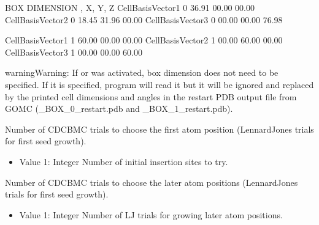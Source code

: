 \documentclass[letterpaper,10pt,english]{sphinxmanual}
\begin{document}
\begin{description}
\begin{sphinxVerbatim}[commandchars=\\\{\}]
\PYGZsh{}\PYGZsh{}\PYGZsh{}\PYGZsh{}\PYGZsh{}\PYGZsh{}\PYGZsh{}\PYGZsh{}\PYGZsh{}\PYGZsh{}\PYGZsh{}\PYGZsh{}\PYGZsh{}\PYGZsh{}\PYGZsh{}\PYGZsh{}\PYGZsh{}\PYGZsh{}\PYGZsh{}\PYGZsh{}\PYGZsh{}\PYGZsh{}\PYGZsh{}\PYGZsh{}\PYGZsh{}\PYGZsh{}\PYGZsh{}\PYGZsh{}\PYGZsh{}\PYGZsh{}\PYGZsh{}\PYGZsh{}\PYGZsh{}\PYGZsh{}\PYGZsh{}\PYGZsh{}\PYGZsh{}\PYGZsh{}\PYGZsh{}\PYGZsh{}\PYGZsh{}\PYGZsh{}\PYGZsh{}\PYGZsh{}
\PYGZsh{} BOX DIMENSION \PYGZsh{}, X, Y, Z
\PYGZsh{}\PYGZsh{}\PYGZsh{}\PYGZsh{}\PYGZsh{}\PYGZsh{}\PYGZsh{}\PYGZsh{}\PYGZsh{}\PYGZsh{}\PYGZsh{}\PYGZsh{}\PYGZsh{}\PYGZsh{}\PYGZsh{}\PYGZsh{}\PYGZsh{}\PYGZsh{}\PYGZsh{}\PYGZsh{}\PYGZsh{}\PYGZsh{}\PYGZsh{}\PYGZsh{}\PYGZsh{}\PYGZsh{}\PYGZsh{}\PYGZsh{}\PYGZsh{}\PYGZsh{}\PYGZsh{}\PYGZsh{}\PYGZsh{}\PYGZsh{}\PYGZsh{}\PYGZsh{}\PYGZsh{}\PYGZsh{}\PYGZsh{}\PYGZsh{}\PYGZsh{}\PYGZsh{}\PYGZsh{}\PYGZsh{}
CellBasisVector1  0   36.91   00.00   00.00
CellBasisVector2  0   \PYGZhy{}18.45  31.96   00.00
CellBasisVector3  0   00.00   00.00   76.98

CellBasisVector1  1   60.00   00.00   00.00
CellBasisVector2  1   00.00   60.00   00.00
CellBasisVector3  1   00.00   00.00   60.00
\end{sphinxVerbatim}

\begin{sphinxadmonition}{warning}{Warning:}
If  or  was activated, box dimension does not need to be specified. If it is specified, program will read it but it will be ignored and replaced by the printed cell dimensions and angles in the restart PDB output file from GOMC (\_BOX\_0\_restart.pdb and \_BOX\_1\_restart.pdb).
\end{sphinxadmonition}

\item[{\sphinxcode{\sphinxupquote{CBMC\_First}}}] \leavevmode
Number of CD\sphinxhyphen{}CBMC trials to choose the first atom position (Lennard\sphinxhyphen{}Jones trials for first seed growth).
\begin{itemize}
\item {} 
Value 1: Integer \sphinxhyphen{} Number of initial insertion sites to try.

\end{itemize}

\item[{\sphinxcode{\sphinxupquote{CBMC\_Nth}}}] \leavevmode
Number of CD\sphinxhyphen{}CBMC trials to choose the later atom positions (Lennard\sphinxhyphen{}Jones trials for first seed growth).
\begin{itemize}
\item {} 
Value 1: Integer \sphinxhyphen{} Number of LJ trials for growing later atom positions.


\end{itemize}
\end{description}
\end{document}
